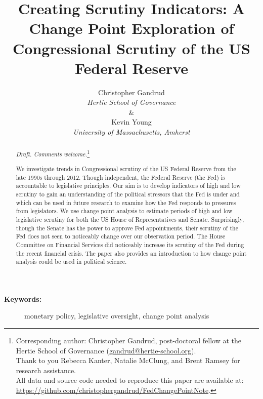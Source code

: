 \documentclass[a4paper]{article}\usepackage[]{graphicx}\usepackage[]{color}
\title{Creating Scrutiny Indicators: A Change Point Exploration of Congressional Scrutiny of the US Federal Reserve}
\author{Christopher Gandrud \\ {\emph{Hertie School of Governance}} \\ \& \\ Kevin Young \\ {\emph{University of Massachusetts, Amherst}}}
\begin{document}
\maketitle

\begin{abstract}

\noindent\emph{Draft. Comments welcome.}\footnote{Corresponding author: Christopher Gandrud, post-doctoral fellow at the Hertie School of Governance (\href{mailto:gandrud@hertie-school.org}{gandrud@hertie-school.org}). \\ Thank to you Rebecca Kanter, Natalie McClung, and Brent Ramsey for research assistance. \\
All data and source code needed to reproduce this paper are available at: \url{https://github.com/christophergandrud/FedChangePointNote}.}

We investigate trends in Congressional scrutiny of the US Federal Reserve from the late 1990s through 2012. Though independent, the Federal Reserve (the Fed) is accountable to legislative principles. Our aim is to develop indicators of high and low scrutiny to gain an understanding of the political stressors that the Fed is under and which can be used in future research to examine how the Fed responds to pressures from legislators. We use change point analysis to estimate periods of high and low legislative scrutiny for both the US House of Representatives and Senate. Surprisingly, though the Senate has the power to approve Fed appointments, their scrutiny of the Fed does not seen to noticeably change over our observation period. The House Committee on Financial Services did noticeably increase its scrutiny of the Fed during the recent financial crisis. The paper also provides an introduction to how change point analysis could be used in political science. 

\end{abstract}

\begin{description}
  \item [{\textbf{Keywords:}}] monetary policy, legislative oversight, change point analysis
\end{description}
\end{document}
